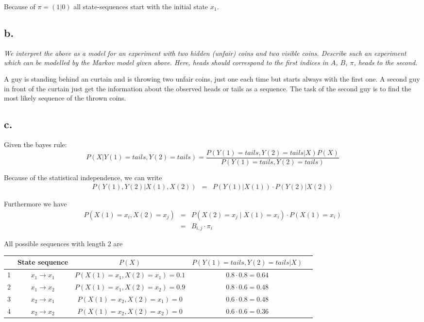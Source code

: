 \documentclass[a4paper, 12pt, titlepage]{article}
\begin{document}
Because of $\pi = (1 | 0)$ all state-sequences start with the initial state $x_1$.
  
\subsection*{b.}


\textit{We interpret the above as a model for an experiment with two hidden (unfair) coins and two visible coins. Describe such an experiment which can be modelled by the Markov model given above. Here, heads should correspond to the first indices in $A$, $B$, $\pi$, heads to the second.} \newline \newline

A guy is standing behind an curtain and is throwing two unfair coins, just one each time but starts always with the first one. A second guy in front of the curtain just get the information about the observed heads or tails as a sequence. The task of the second guy is to find the most likely sequence of the thrown coins.


\subsection*{c.}

Given the bayes rule:
\begin{equation}
   P(X|Y(1)=tails,Y(2)=tails) =  \frac{P(Y(1)=tails,Y(2)=tails|X)P(X)}{P(Y(1)=tails,Y(2)=tails)}
\end{equation}

Because of the statistical independence, we can write
\begin{eqnarray}
  P(Y(1),Y(2)|X(1),X(2)) &=& P(Y(1)|X(1)) \cdot P(Y(2)|X(2))
\end{eqnarray}

Furthermore we have
\begin{eqnarray}
	P(X(1)=x_i,X(2)=x_j)&=& P(X(2)=x_j\mid X(1)=x_i) \cdot P(X(1) = x_i) \\
	&=& B_{i,j} \cdot \pi_i
\end{eqnarray}

All possible sequences with length $2$ are

\begin{tabular}{l*{3}{c}r}
              & State sequence & $P(X)$ & $P(Y(1)=tails,Y(2)=tails|X) $ \\
\hline
1 &  $x_1 \rightarrow x_1$ & $P(X(1)=x_1,X(2)=x_1)=0.1$ & $ 0.8\cdot 0.8=0.64 $\\
2 &  $x_1 \rightarrow x_2$ & $P(X(1)=x_1,X(2)=x_2)=0.9$ & $ 0.8\cdot 0.6= 0.48 $ \\
3 &  $x_2 \rightarrow x_1$ & $P(X(1)=x_2,X(2)=x_1)= 0$ & $ 0.6 \cdot 0.8 = 0.48 $ \\
4 &  $x_2 \rightarrow x_2$ & $P(X(1)=x_2,X(2)=x_2)= 0$ & $ 0.6 \cdot 0.6 = 0.36 $
 \end{tabular}
\end{document}
